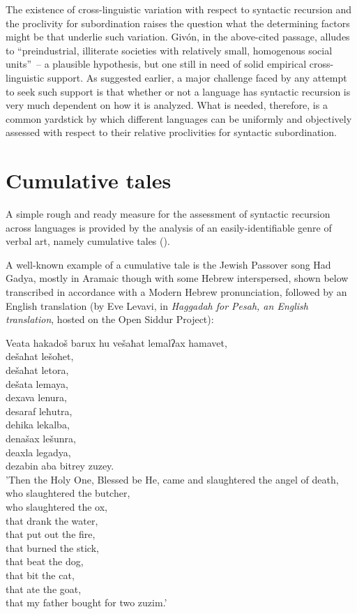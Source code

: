 \documentclass[output=paper,colorlinks,citecolor=brown
]{langscibook}
\begin{document}
The existence of cross-linguistic variation with respect to syntactic recursion and the proclivity for subordination raises the question what the determining factors might be that underlie such variation.  Givón, in the above-cited passage, alludes to ``preindustrial, illiterate societies with relatively small, homogenous social units''~– a plausible hypothesis, but one still in need of solid empirical cross-linguistic support.  As suggested earlier, a major challenge faced by any attempt to seek such support is that whether or not a language has syntactic recursion is very much dependent on how it is analyzed.  What is needed, therefore, is a common yardstick by which different languages can be uniformly and objectively assessed with respect to their relative proclivities for syntactic subordination.

\section{Cumulative tales}
A simple rough and ready measure for the assessment of syntactic recursion across languages is provided by the analysis of an easily-identifiable genre of verbal art, namely cumulative tales (\cites[230--234]{thompson1946folktale}[522--536]{aarne1961types}).

A well-known example of a cumulative tale is the Jewish Passover song Had Gadya, mostly in Aramaic though with some Hebrew interspersed, shown below transcribed in accordance with a Modern Hebrew pronunciation, followed by an English translation (by Eve Levavi, in \textit{Haggadah for Pesah, an English translation}, hosted on the Open Siddur Project):

\ea \label{ex:gil:10}

Veata hakadoš barux hu vešaħat lemalʔax hamavet,\\	
 dešaħat lešoħet,\\
 dešaħat letora,\\
 dešata lemaya,\\
 dexava lenura,\\
 desaraf leħutra,\\
 dehika lekalba,\\
 denašax lešunra,\\
 deaxla legadya,\\
 dezabin aba bitrey zuzey.\\

 'Then the Holy One, Blessed be He, came and slaughtered the angel of death,\\
 who slaughtered the butcher,\\
 who slaughtered the ox, \\
 that drank the water, \\
 that put out the fire, \\
 that burned the stick, \\
 that beat the dog, \\
 that bit the cat, \\
 that ate the goat, \\
 that my father bought for two zuzim.'
\end{document}
